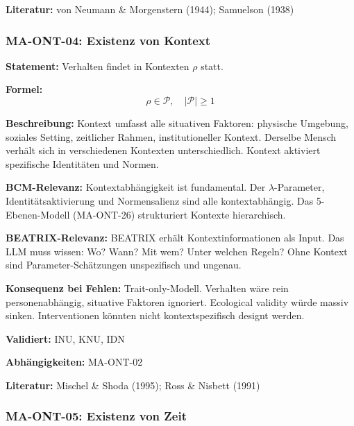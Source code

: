 \textbf{Literatur:} von Neumann \& Morgenstern (1944); Samuelson (1938)


\subsubsection*{MA-ONT-04: Existenz von Kontext}

\textbf{Statement:} Verhalten findet in Kontexten $\rho$ statt.

\textbf{Formel:}
\begin{equation}
\rho \in \mathcal{P}, \quad |\mathcal{P}| \geq 1
\end{equation}

\textbf{Beschreibung:}
Kontext umfasst alle situativen Faktoren: physische Umgebung, soziales Setting, zeitlicher Rahmen, institutioneller Kontext. Derselbe Mensch verhält sich in verschiedenen Kontexten unterschiedlich. Kontext aktiviert spezifische Identitäten und Normen.

\textbf{BCM-Relevanz:}
Kontextabhängigkeit ist fundamental. Der $\lambda$-Parameter, Identitätsaktivierung und Normensalienz sind alle kontextabhängig. Das 5-Ebenen-Modell (MA-ONT-26) strukturiert Kontexte hierarchisch.

\textbf{BEATRIX-Relevanz:}
BEATRIX erhält Kontextinformationen als Input. Das LLM muss wissen: Wo? Wann? Mit wem? Unter welchen Regeln? Ohne Kontext sind Parameter-Schätzungen unspezifisch und ungenau.

\textbf{Konsequenz bei Fehlen:}
Trait-only-Modell. Verhalten wäre rein personenabhängig, situative Faktoren ignoriert. Ecological validity würde massiv sinken. Interventionen könnten nicht kontextspezifisch designt werden.

\textbf{Validiert:} INU, KNU, IDN

\textbf{Abhängigkeiten:} MA-ONT-02

\textbf{Literatur:} Mischel \& Shoda (1995); Ross \& Nisbett (1991)


\subsubsection*{MA-ONT-05: Existenz von Zeit}

